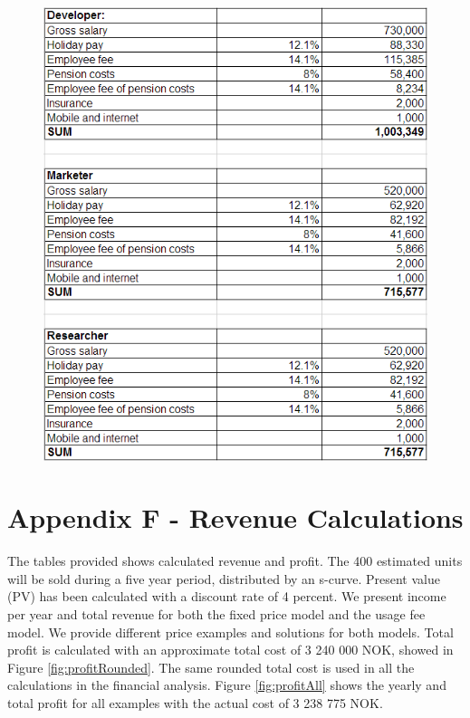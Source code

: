 \begin{figure}
\begin{center}
\includegraphics[scale=0.8]{appendixlonn}
\label{fig:employee}
\end{center}
\end{figure}


\newpage
\section*{Appendix F - Revenue Calculations}
\label{F}

The tables provided shows calculated revenue and profit. The 400 estimated units will be sold during a five year period, distributed by an s-curve. Present value (PV) has been calculated with a discount rate of 4 percent. We present income per year and total revenue for both the fixed price model and the usage fee model. We provide different price examples and solutions for both models. Total profit is calculated with an approximate total cost of 3 240 000 NOK, showed in Figure \ref{fig:profitRounded}. The same rounded total cost is used in all the calculations in the financial analysis. Figure \ref{fig:profitAll} shows the yearly and total profit for all examples with the actual cost of  3 238 775 NOK. \\ \\
\bigskip
\bigskip
\bigskip
\bigskip
\bigskip
\bigskip
\bigskip
\bigskip
\bigskip
\bigskip
\bigskip
\bigskip

